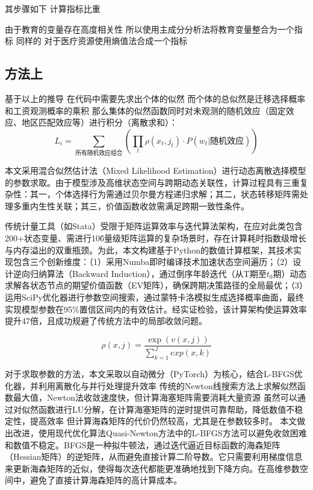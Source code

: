 \documentclass[a4paper,10pt]{article}
\begin{document}
其步骤如下
计算指标比重


由于教育的变量存在高度相关性
所以使用主成分分析法将教育变量整合为一个指标
同样的
对于医疗资源使用熵值法合成一个指标

\subsection{方法上} %
\label{sub:方法上}
基于以上的推导
在代码中需要先求出个体的似然
而个体的总似然是迁移选择概率和工资观测概率的乘积
那么集体的似然函数同时对未观测的随机效应（固定效应、地区匹配效应等）进行积分（离散求和）：
\begin{equation}
  L_{i}=\sum\limits_{\text{所有随机效应组合}}(\prod_{t}\rho(x_{t},j_{t})⋅P(w_{t}|\text{随机效应}))
\end{equation}

本文采用混合似然估计法（Mixed Likelihood Estimation）进行动态离散选择模型的参数求取。由于模型涉及高维状态空间与跨期动态关联性，计算过程具有三重复杂性：其一，个体选择行为需通过贝尔曼方程递归求解；其二，状态转移矩阵需处理多重内生性关联；其三，价值函数收敛需满足跨期一致性条件。

传统计量工具（如Stata）受限于矩阵运算效率与迭代算法架构，在应对此类包含200+状态变量、需进行10\^6量级矩阵运算的复杂场景时，存在计算耗时指数级增长与内存溢出的双重瓶颈。为此，本文构建基于Python的数值计算框架，其技术实现包含三个创新维度：（1）采用Numba即时编译技术加速状态空间遍历；（2）设计逆向归纳算法（Backward Induction），通过倒序年龄迭代（从T期至$t_0$期）动态求解各状态节点的期望价值函数（EV矩阵），确保跨期决策路径的全局最优；（3）运用SciPy优化器进行参数空间搜索，通过蒙特卡洛模拟生成选择概率曲面，最终实现模型参数在95\%置信区间内的有效估计。经实证检验，该计算架构使运算效率提升47倍，且成功规避了传统方法中的局部收敛问题。

\begin{equation}
  \rho(x,j)=\frac{\exp(v(x,j))}{\sum\limits_{k=1}^{J} exp(x,k)}
\end{equation}

对于求取参数的方法，本文采取以自动微分（PyTorch）为核心，结合L-BFGS优化器，并利用离散化与并行处理提升效率
传统的Newton线搜索方法上求解似然函数最大值，Newton法收敛速度快，但计算海塞矩阵需要消耗大量资源
虽然可以通过对似然函数进行LU分解，在计算海塞矩阵的逆时提供可靠帮助，降低数值不稳定性，提高效率
但计算海森矩阵的代价仍然较高，尤其是在参数较多时。
本文做出改进，使用现代优化算法Quasi-Newton方法中的L-BFGS方法可以避免收敛困难和数值不稳定。BFGS是一种拟牛顿法，通过迭代逼近目标函数的海森矩阵（Hessian矩阵）的逆矩阵，从而避免直接计算二阶导数。它只需要利用梯度信息来更新海森矩阵的近似，使得每次迭代都能更准确地找到下降方向。在高维参数空间中，避免了直接计算海森矩阵的高计算成本。
\end{document}
